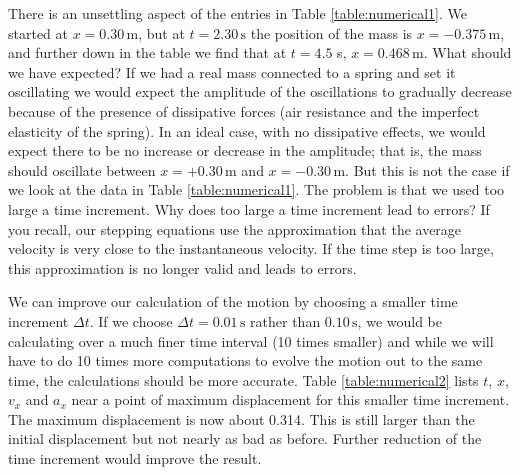 There is an unsettling aspect of the entries in Table
\ref{table:numerical1}.  We started at $x = 0.30\, \mbox{m}$, but at
$t = 2.30\, \mbox{s}$ the position of the mass is $x = -0.375\,
\mbox{m}$, and further down in the table we find that at $t = 4.5$ s,
$x = 0.468\, \mbox{m}$.  What should we have expected?  If we had a
real mass connected to a spring and set it oscillating we would expect
the amplitude of the oscillations to gradually decrease because of the
presence of dissipative forces (air resistance and the imperfect
elasticity of the spring).  In an ideal case, with no dissipative
effects, we would expect there to be no increase or decrease in the
amplitude; that is, the mass should oscillate between $x = +0.30\,
\mbox{m}$ and $x = -0.30\, \mbox{m}$.  But this is not the case if we
look at the data in Table \ref{table:numerical1}.  The problem is that
we used too large a time increment.  Why does too large a time
increment lead to errors?  If you recall, our stepping equations use
the approximation that the average velocity is very close to the
instantaneous velocity.  If the time step is too large, this
approximation is no longer valid and leads to errors.
   
We can improve our calculation of the motion by choosing a smaller
time increment $\Delta t$.  If we choose $\Delta t = 0.01\, \mbox{s}$
rather than $0.10\, \mbox{s}$, we would be calculating over a much
finer time interval (10 times smaller) and while we will have to do 10
times more computations to evolve the motion out to the same time, the
calculations should be more accurate.  Table \ref{table:numerical2}
lists $t$, $x$, $v_x$ and $a_x$ near a point of maximum displacement for
this smaller time increment.  The maximum displacement is now about
0.314.  This is still larger than the initial displacement but not
nearly as bad as before.  Further reduction of the time increment
would improve the result.


\addtolength{\textheight}{.5in}
\addtolength{\footskip}{-2.in}
\mbox{}
\vspace{-2.in}



